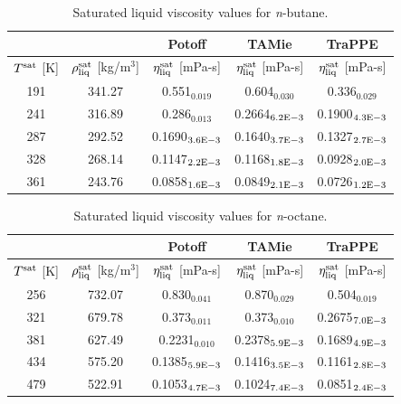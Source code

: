 \documentclass[preprint,review,11pt]{elsarticle}
\begin{document}
	\begin{table}[H]
		\caption{Saturated liquid viscosity values for \textit{n}-butane.}
		\begin{center}
			\begin{tabular}{|c|c|c|c|c|}
				\hline
				&                                       & Potoff            & TAMie             & TraPPE            \\ \hline
				$T^{\rm sat}$ {[}K{]} & $\rho^{\rm sat}_{\rm liq}$ [kg/m$^3$] & $\eta_{\rm liq}^{\rm sat}$ {[}mPa-s{]} & $\eta_{\rm liq}^{\rm sat}$ {[}mPa-s{]} & $\eta_{\rm liq}^{\rm sat}$ {[}mPa-s{]} \\ \hline
				191 & 341.27 & 0.551$_{0.019}$   & 0.604$_{0.030}$   & 0.336$_{0.029}$   \\ \hline
				241 & 316.89 & 0.286$_{0.013}$   & 0.2664$_{6.2 \rm E-3}$ & 0.1900$_{4.3 \rm E-3}$ \\ \hline
				287 & 292.52 & 0.1690$_{3.6 \rm E-3}$ & 0.1640$_{3.7 \rm E-3}$ & 0.1327$_{2.7 \rm E-3}$ \\ \hline
				328 & 268.14 & 0.1147$_{2.2 \rm E-3}$ & 0.1168$_{1.8 \rm E-3}$ & 0.0928$_{2.0 \rm E-3}$ \\ \hline
				361 & 243.76 & 0.0858$_{1.6 \rm E-3}$ & 0.0849$_{2.1 \rm E-3}$ & 0.0726$_{1.2 \rm E-3}$ \\ \hline
			\end{tabular}
		\end{center}
	\end{table}
	
	\begin{table}[H]
		\caption{Saturated liquid viscosity values for \textit{n}-octane.}
		\begin{center}
			\begin{tabular}{|c|c|c|c|c|}
				\hline
				&                                       & Potoff            & TAMie             & TraPPE            \\ \hline
				$T^{\rm sat}$ {[}K{]} & $\rho^{\rm sat}_{\rm liq}$ [kg/m$^3$] & $\eta_{\rm liq}^{\rm sat}$ {[}mPa-s{]} & $\eta_{\rm liq}^{\rm sat}$ {[}mPa-s{]} & $\eta_{\rm liq}^{\rm sat}$ {[}mPa-s{]} \\ \hline
				256 & 732.07 & 0.830$_{0.041}$   & 0.870$_{0.029}$   & 0.504$_{0.019}$   \\ \hline
				321 & 679.78 & 0.373$_{0.011}$   & 0.373$_{0.010}$   & 0.2675$_{7.0 \rm E-3}$ \\ \hline
				381 & 627.49 & 0.2231$_{0.010}$  & 0.2378$_{5.9 \rm E-3}$ & 0.1689$_{4.9 \rm E-3}$ \\ \hline
				434 & 575.20 & 0.1385$_{5.9 \rm E-3}$ & 0.1416$_{3.5 \rm E-3}$ & 0.1161$_{2.8 \rm E-3}$ \\ \hline
				479 & 522.91 & 0.1053$_{4.7 \rm E-3}$ & 0.1024$_{7.4 \rm E-3}$ & 0.0851$_{2.4 \rm E-3}$ \\ \hline
			\end{tabular}
		\end{center}
	\end{table}
	
\end{document}
